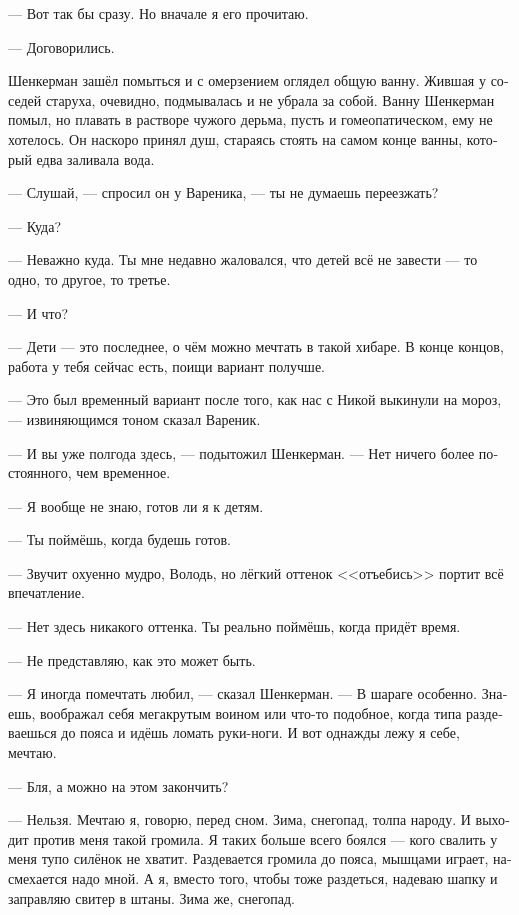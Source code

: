 \documentclass[a5paper,12pt,fleqn]{extbook}\usepackage{cooltooltips}\usepackage{polyglossia}\setdefaultlanguage[babelshorthands=true]{russian}\setotherlanguage{english}\defaultfontfeatures{Ligatures=TeX,Mapping=tex-text} \usepackage{xcolor}\definecolor{lightgray}{HTML}{bbbbbb}\color{lightgray}\newcommand{\ml}[3]{\textenglish{\textcolor{black}{#3}}}
\newcommand{\asterism}{\vspace{1em}{\centering\Large\bfseries$\ast~\ast~\ast$\par}\vspace{1em}}
\newcommand{\textspace}{\vspace{1em}{\centering\Large\bfseries<...>\par}\vspace{1em}}
\begin{document}
--- Вот так бы сразу.
Но вначале я его прочитаю.

--- Договорились.

\asterism

\textspace

Шенкерман зашёл помыться и с омерзением оглядел общую ванну.
Жившая у соседей старуха, очевидно, подмывалась и не убрала за собой.
Ванну Шенкерман помыл, но плавать в растворе чужого дерьма, пусть и гомеопатическом, ему не хотелось.
Он наскоро принял душ, стараясь стоять на самом конце ванны, который едва заливала вода.

--- Слушай, --- спросил он у Вареника, --- ты не думаешь переезжать?

--- Куда?

--- Неважно куда.
Ты мне недавно жаловался, что детей всё не завести --- то одно, то другое, то третье.

--- И что?

--- Дети --- это последнее, о чём можно мечтать в такой хибаре.
В конце концов, работа у тебя сейчас есть, поищи вариант получше.

--- Это был временный вариант после того, как нас с Никой выкинули на мороз, --- извиняющимся тоном сказал Вареник.

--- И вы уже полгода здесь, --- подытожил Шенкерман.
--- Нет ничего более постоянного, чем временное.

--- Я вообще не знаю, готов ли я к детям.

--- Ты поймёшь, когда будешь готов.

--- Звучит охуенно мудро, Володь, но лёгкий оттенок <<отъебись>> портит всё впечатление.

--- Нет здесь никакого оттенка.
Ты реально поймёшь, когда придёт время.

--- Не представляю, как это может быть.

--- Я иногда помечтать любил, --- сказал Шенкерман.
--- В шараге особенно.
Знаешь, воображал себя мегакрутым воином или что-то подобное, когда типа раздеваешься до пояса и идёшь ломать руки-ноги.
И вот однажды лежу я себе, мечтаю.

--- Бля, а можно на этом закончить?

--- Нельзя.
Мечтаю я, говорю, перед сном.
Зима, снегопад, толпа народу.
И выходит против меня такой громила.
Я таких больше всего боялся --- кого свалить у меня тупо силёнок не хватит.
Раздевается громила до пояса, мышцами играет, насмехается надо мной.
А я, вместо того, чтобы тоже раздеться, надеваю шапку и заправляю свитер в штаны.
Зима же, снегопад.
\end{document}
